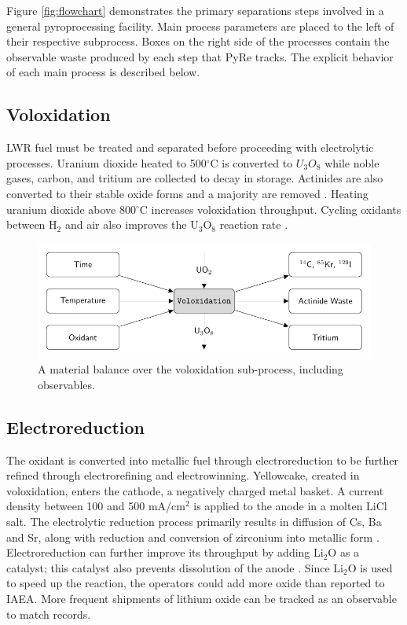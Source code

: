 \documentclass{anstrans}
\begin{document}
Figure \ref{fig:flowchart} demonstrates the primary separations steps involved in a general pyroprocessing facility. Main process parameters are placed to the left of their respective subprocess. Boxes on the 
right side of the processes contain the observable waste produced by each step that \gls{PyRe} tracks. 
The explicit behavior of each main process is described below. 

\subsection{Voloxidation}

\gls{LWR} fuel must be treated and separated before proceeding with electrolytic processes. Uranium dioxide heated to 
500$^{\circ}$C is converted to $U_3O_8$ while noble gases, carbon, and tritium are collected to decay in storage. 
Actinides are also converted to their stable oxide forms and a majority are removed \cite{flowsheet_1998,jubin_spent_2009}. 
Heating uranium dioxide above 800$^{\circ}$C increases voloxidation throughput.
Cycling oxidants between H$_2$ and air also improves the U$_3$O$_8$ reaction rate \cite{jubin_spent_2009}.

\begin{figure}[ht]
	\centering
	\includegraphics[width=\linewidth]{volox}
	\caption{A material balance over the voloxidation sub-process, including observables.}
	\label{fig:volox}
\end{figure}

\subsection{Electroreduction}

The oxidant is converted into metallic fuel through electroreduction to be further refined through electrorefining and electrowinning. 
Yellowcake, created in voloxidation, enters the cathode, a negatively charged metal basket. 
A current density between 100 and 500 mA/cm$^2$ is applied to the anode in a molten LiCl salt. 
The electrolytic reduction process primarily results in diffusion of Cs, Ba and Sr, along with reduction and conversion of zirconium into metallic form \cite{choi_electrochemical_2015,flowsheet_1998}.
Electroreduction can further improve its throughput by adding Li$_2$O as a catalyst; this catalyst also prevents dissolution 
of the anode \cite{choi_electrochemical_2015}. Since Li$_2$O is used to speed up the reaction,
the operators could add more oxide than reported to \gls{IAEA}. More frequent shipments 
of lithium oxide can be tracked as an observable to match records.
\end{document}
